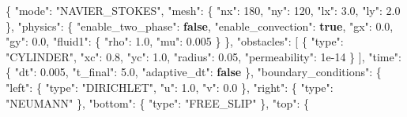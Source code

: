 \documentclass[
  10pt,
]{article}
\newenvironment{Shaded}{}{}
\newcommand{\DataTypeTok}[1]{\textcolor[rgb]{0.56,0.13,0.00}{#1}}
\newcommand{\DecValTok}[1]{\textcolor[rgb]{0.25,0.63,0.44}{#1}}
\newcommand{\FloatTok}[1]{\textcolor[rgb]{0.25,0.63,0.44}{#1}}
\newcommand{\FunctionTok}[1]{\textcolor[rgb]{0.02,0.16,0.49}{#1}}
\newcommand{\KeywordTok}[1]{\textcolor[rgb]{0.00,0.44,0.13}{\textbf{#1}}}
\newcommand{\OtherTok}[1]{\textcolor[rgb]{0.00,0.44,0.13}{#1}}
\newcommand{\StringTok}[1]{\textcolor[rgb]{0.25,0.44,0.63}{#1}}
\begin{document}
\begin{Shaded}
\begin{Highlighting}[]
\FunctionTok{\{}
  \DataTypeTok{"mode"}\FunctionTok{:} \StringTok{"NAVIER\_STOKES"}\FunctionTok{,}
  \DataTypeTok{"mesh"}\FunctionTok{:} \FunctionTok{\{}
    \DataTypeTok{"nx"}\FunctionTok{:} \DecValTok{180}\FunctionTok{,}
    \DataTypeTok{"ny"}\FunctionTok{:} \DecValTok{120}\FunctionTok{,}
    \DataTypeTok{"lx"}\FunctionTok{:} \FloatTok{3.0}\FunctionTok{,}
    \DataTypeTok{"ly"}\FunctionTok{:} \FloatTok{2.0}
  \FunctionTok{\},}
  \DataTypeTok{"physics"}\FunctionTok{:} \FunctionTok{\{}
    \DataTypeTok{"enable\_two\_phase"}\FunctionTok{:} \KeywordTok{false}\FunctionTok{,}
    \DataTypeTok{"enable\_convection"}\FunctionTok{:} \KeywordTok{true}\FunctionTok{,}
    \DataTypeTok{"gx"}\FunctionTok{:} \FloatTok{0.0}\FunctionTok{,}
    \DataTypeTok{"gy"}\FunctionTok{:} \FloatTok{0.0}\FunctionTok{,}
    \DataTypeTok{"fluid1"}\FunctionTok{:} \FunctionTok{\{}
      \DataTypeTok{"rho"}\FunctionTok{:} \FloatTok{1.0}\FunctionTok{,}
      \DataTypeTok{"mu"}\FunctionTok{:} \FloatTok{0.005}
    \FunctionTok{\}}
  \FunctionTok{\},}
  \DataTypeTok{"obstacles"}\FunctionTok{:} \OtherTok{[}
    \FunctionTok{\{}
      \DataTypeTok{"type"}\FunctionTok{:} \StringTok{"CYLINDER"}\FunctionTok{,}
      \DataTypeTok{"xc"}\FunctionTok{:} \FloatTok{0.8}\FunctionTok{,}
      \DataTypeTok{"yc"}\FunctionTok{:} \FloatTok{1.0}\FunctionTok{,}
      \DataTypeTok{"radius"}\FunctionTok{:} \FloatTok{0.05}\FunctionTok{,}
      \DataTypeTok{"permeability"}\FunctionTok{:} \DecValTok{1e{-}14}
    \FunctionTok{\}}
  \OtherTok{]}\FunctionTok{,}
  \DataTypeTok{"time"}\FunctionTok{:} \FunctionTok{\{}
    \DataTypeTok{"dt"}\FunctionTok{:} \FloatTok{0.005}\FunctionTok{,}
    \DataTypeTok{"t\_final"}\FunctionTok{:} \FloatTok{5.0}\FunctionTok{,}
    \DataTypeTok{"adaptive\_dt"}\FunctionTok{:} \KeywordTok{false}
  \FunctionTok{\},}
  \DataTypeTok{"boundary\_conditions"}\FunctionTok{:} \FunctionTok{\{}
    \DataTypeTok{"left"}\FunctionTok{:} \FunctionTok{\{}
      \DataTypeTok{"type"}\FunctionTok{:} \StringTok{"DIRICHLET"}\FunctionTok{,}
      \DataTypeTok{"u"}\FunctionTok{:} \FloatTok{1.0}\FunctionTok{,}
      \DataTypeTok{"v"}\FunctionTok{:} \FloatTok{0.0}
    \FunctionTok{\},}
    \DataTypeTok{"right"}\FunctionTok{:} \FunctionTok{\{}
      \DataTypeTok{"type"}\FunctionTok{:} \StringTok{"NEUMANN"}
    \FunctionTok{\},}
    \DataTypeTok{"bottom"}\FunctionTok{:} \FunctionTok{\{}
      \DataTypeTok{"type"}\FunctionTok{:} \StringTok{"FREE\_SLIP"}
    \FunctionTok{\},}
    \DataTypeTok{"top"}\FunctionTok{:} \FunctionTok{\{}

\end{Highlighting}
\end{Shaded}
\end{document}
